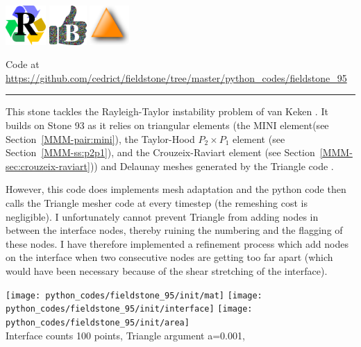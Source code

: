 \includegraphics[height=1.5cm]{images/pictograms/replication}
\includegraphics[height=1.5cm]{images/pictograms/benchmark}
\includegraphics[height=1.5cm]{images/pictograms/triangle}



\begin{center}
Code at \url{https://github.com/cedrict/fieldstone/tree/master/python_codes/fieldstone_95}
\end{center}

\par\noindent\rule{\textwidth}{0.4pt}


This stone tackles the Rayleigh-Taylor instability problem of van Keken \etal \cite{vaks97}. 
It builds on Stone 93 as it relies on triangular elements (the MINI 
element(see Section~\ref{MMM-pair:mini}), 
the Taylor-Hood $P_2\times P_1$ element (see Section~\ref{MMM-ss:p2p1}), 
and the Crouzeix-Raviart element (see Section~\ref{MMM-sec:crouzeix-raviart})) and Delaunay meshes
generated by the Triangle code \cite{shew14}.  

However, this code does implements mesh adaptation and the python code then calls the Triangle mesher code
at every timestep (the remeshing cost is negligible).
I unfortunately cannot prevent Triangle from adding nodes in between the interface nodes, thereby 
ruining the numbering and the flagging of these nodes. I have therefore implemented a refinement 
process which add nodes on the interface when two consecutive nodes are getting too far apart (which 
would have been necessary because of the shear stretching of the interface). 

\begin{center}
\texttt{[image: python\_codes/fieldstone\_95/init/mat]}
\texttt{[image: python\_codes/fieldstone\_95/init/interface]}
\texttt{[image: python\_codes/fieldstone\_95/init/area]}\\
{\captionfont Interface counts 100 points, Triangle argument a=0.001, } 
\end{center}

